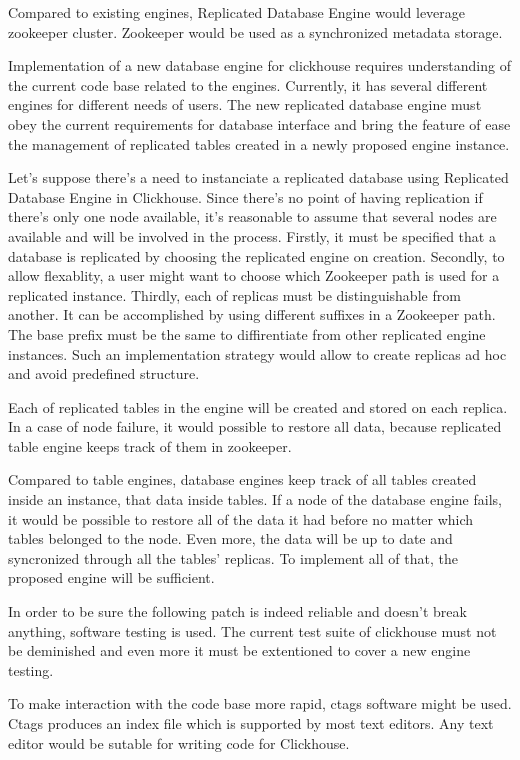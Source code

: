 \documentclass[conference]{IEEEtran}
\begin{document}
Compared to existing engines, Replicated Database Engine
would leverage zookeeper cluster. Zookeeper would be used as a synchronized
metadata storage.

Implementation of a new database engine for clickhouse requires understanding of
the current code base related to the engines. Currently, it has several different
engines for different needs of users. The new replicated database engine must
obey the current requirements for database interface and bring the feature of ease
the management of replicated tables created in a newly proposed engine instance.

Let's suppose there's a need to instanciate a replicated database using
Replicated Database Engine in Clickhouse. Since there's no point of having replication
if there's only one node available, it's reasonable to assume that several nodes are
available and will be involved in the process. Firstly, it must be specified that
a database is replicated by choosing the replicated engine on creation. Secondly,
to allow flexablity, a user might want to choose which Zookeeper path is used for a
replicated instance. Thirdly, each of replicas must be distinguishable from another.
It can be accomplished by using different suffixes in a Zookeeper path. The base prefix
must be the same to diffirentiate from other replicated engine instances.
Such an implementation strategy would allow to create replicas ad hoc and avoid
predefined structure.

Each of replicated tables in the engine will be created and stored on each replica.
In a case of node failure, it would possible to restore all data, because replicated
table engine keeps track of them in zookeeper.

Compared to table engines, database engines keep track of all tables created inside an
instance, that data inside tables. If a node of the database engine fails, it would
be possible to restore all of the data it had before no matter which tables belonged
to the node. Even more, the data will be up to date and syncronized through all the tables'
replicas. To implement all of that, the proposed engine will be sufficient.

In order to be sure the following patch is indeed reliable and doesn't break anything,
software testing is used. The current test suite of clickhouse must not be
deminished and even more it must be extentioned to cover a new engine testing.

To make interaction with the code base more
rapid, ctags software might be used. Ctags produces an index file which is supported
by most text editors. Any text editor would be sutable for writing code for Clickhouse.
\end{document}

